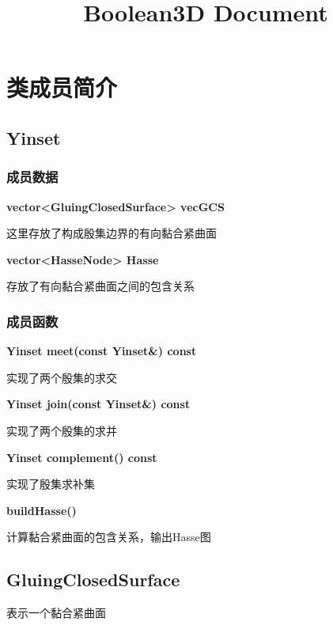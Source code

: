 \documentclass[a4paper]{book}
\makeatletter
\newcommand{\voidenvironment}[1]{%
\expandafter\providecommand\csname env@#1@save@env\endcsname{}%
\expandafter\providecommand\csname env@#1@process\endcsname{}%
\@ifundefined{#1}{}{\RenewEnviron{#1}{}}%
}
\numberwithin{equation}{chapter}
\theoremstyle{definition}
\makeatother
\begin{document}
\pagestyle{empty}




\setcounter{chapter}{0}




\title{Boolean3D Document}

\chapter{类成员简介}
\section{Yinset}
\subsection{成员数据}
\textbf{vector<GluingClosedSurface> vecGCS}

这里存放了构成殷集边界的有向黏合紧曲面

\textbf{vector<HasseNode> Hasse}

存放了有向黏合紧曲面之间的包含关系
\subsection{成员函数}
\textbf{Yinset meet(const Yinset\&) const}

实现了两个殷集的求交

\textbf{Yinset join(const Yinset\&) const}

实现了两个殷集的求并

\textbf{Yinset complement() const}

实现了殷集求补集

\textbf{buildHasse()}

计算黏合紧曲面的包含关系，输出Hasse图


\section{GluingClosedSurface}
表示一个黏合紧曲面
\end{document}
